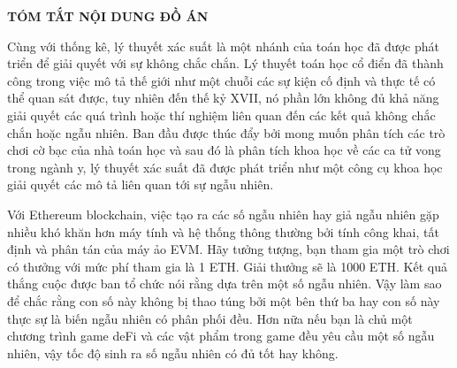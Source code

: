 \documentclass[../main.tex]{subfiles}
\begin{document}
\begin{center}
    \Large{\textbf{TÓM TẮT NỘI DUNG ĐỒ ÁN}}\\
\end{center}
\vspace{1cm}

Cùng với thống kê, lý thuyết xác suất là một nhánh của toán học đã được phát triển để giải quyết với sự không chắc chắn. Lý thuyết toán học cổ điển đã thành công trong việc mô tả thế giới như một chuỗi các sự kiện cố định và thực tế có thể quan sát được, tuy nhiên đến thế kỷ XVII, nó phần lớn không đủ khả năng giải quyết các quá trình hoặc thí nghiệm liên quan đến các kết quả không chắc chắn hoặc ngẫu nhiên. Ban đầu được thúc đẩy bởi mong muốn phân tích các trò chơi cờ bạc của nhà toán học và sau đó là phân tích khoa học về các ca tử vong trong ngành y, lý thuyết xác suất đã được phát triển như một công cụ khoa học giải quyết các mô tả liên quan tới sự ngẫu nhiên.

Với Ethereum blockchain, việc tạo ra các số ngẫu nhiên hay giả ngẫu nhiên gặp nhiều khó khăn hơn máy tính và hệ thống thông thường bởi tính công khai, tất định và phân tán của máy ảo EVM. Hãy tưởng tượng, bạn tham gia một trò chơi có thưởng với mức phí tham gia là 1 ETH. Giải thưởng sẽ là 1000 ETH. Kết quả thắng cuộc được ban tổ chức nói rằng dựa trên một số ngẫu nhiên. Vậy làm sao để chắc rằng con số này không bị thao túng bởi một bên thứ ba hay con số này thực sự là biến ngẫu nhiên có phân phối đều. Hơn nữa nếu bạn là chủ một chương trình game deFi và các vật phẩm trong game đều yêu cầu một số ngẫu nhiên, vậy tốc độ sinh ra số ngẫu nhiên có đủ tốt hay không. 

\end{document}
